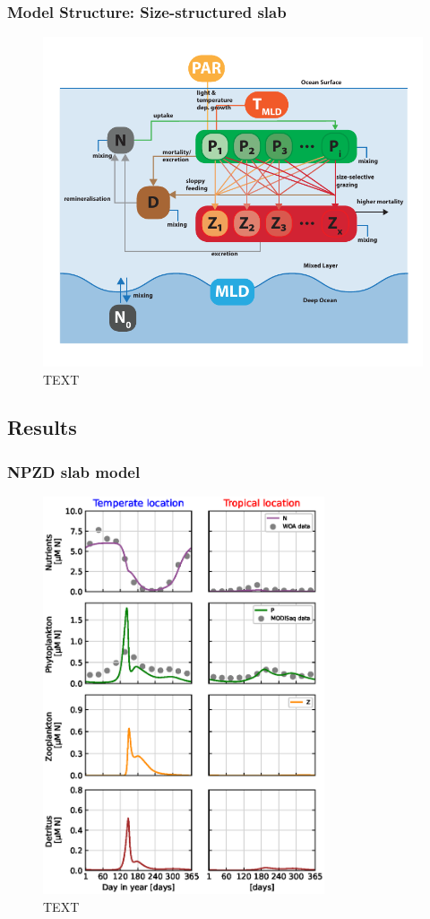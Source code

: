 \documentclass[journal abbreviation, manuscript]{copernicus}
\begin{document}
\subsubsection{Model Structure: Size-structured slab}
\begin{figure}[t]
\includegraphics[width=12cm]{Figures/firstdraft_schematics/03__schematics_SizeStructSlab.pdf}
\caption{TEXT}
\label{phydraschematics_3}
\end{figure}


\subsection{Results}

\subsubsection{NPZD slab model}

\begin{figure}[t]
\includegraphics[width=8.3cm]{Figures/firstdraft_plots/02_NPZDslab.eps}
\caption{TEXT}
\end{figure}
\end{document}
